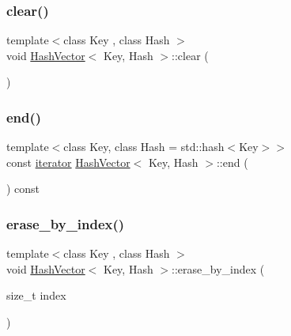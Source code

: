 \subsubsection{\texorpdfstring{clear()}{clear()}}
{\footnotesize\ttfamily template$<$class Key , class Hash $>$ \\
void \mbox{\hyperlink{class_hash_vector}{Hash\+Vector}}$<$ Key, Hash $>$\+::clear (\begin{DoxyParamCaption}{ }\end{DoxyParamCaption})}

\mbox{\label{class_hash_vector_a65851ab7117e4ebfe3de7cdd926bf1a3}} 
\subsubsection{\texorpdfstring{end()}{end()}}
{\footnotesize\ttfamily template$<$class Key, class Hash = std\+::hash$<$\+Key$>$$>$ \\
const \mbox{\hyperlink{class_hash_vector_1_1iterator}{iterator}} \mbox{\hyperlink{class_hash_vector}{Hash\+Vector}}$<$ Key, Hash $>$\+::end (\begin{DoxyParamCaption}{ }\end{DoxyParamCaption}) const\hspace{0.3cm}{\ttfamily [inline]}}

\mbox{\label{class_hash_vector_a1524c108e36d8809d27c081434b9795d}} 
\subsubsection{\texorpdfstring{erase\+\_\+by\+\_\+index()}{erase\_by\_index()}\hspace{0.1cm}{\footnotesize\ttfamily [1/2]}}
{\footnotesize\ttfamily template$<$class Key , class Hash $>$ \\
void \mbox{\hyperlink{class_hash_vector}{Hash\+Vector}}$<$ Key, Hash $>$\+::erase\+\_\+by\+\_\+index (\begin{DoxyParamCaption}\item[{size\+\_\+t}]{index }\end{DoxyParamCaption})}


